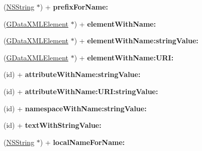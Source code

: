 \begin{DoxyCompactItemize}
\item 
\hypertarget{interface_g_data_x_m_l_node_ad6038ded1bfe166d7c87718dde7a466f}{
(\hyperlink{class_n_s_string}{NSString} $\ast$) + {\bfseries prefixForName:}}
\label{interface_g_data_x_m_l_node_ad6038ded1bfe166d7c87718dde7a466f}

\item 
\hypertarget{interface_g_data_x_m_l_node_ad7e4405c6195d993a5633faa1899c8a0}{
(\hyperlink{interface_g_data_x_m_l_element}{GDataXMLElement} $\ast$) + {\bfseries elementWithName:}}
\label{interface_g_data_x_m_l_node_ad7e4405c6195d993a5633faa1899c8a0}

\item 
\hypertarget{interface_g_data_x_m_l_node_ad8afb69afa7b083627e8a6db5eba45f7}{
(\hyperlink{interface_g_data_x_m_l_element}{GDataXMLElement} $\ast$) + {\bfseries elementWithName:stringValue:}}
\label{interface_g_data_x_m_l_node_ad8afb69afa7b083627e8a6db5eba45f7}

\item 
\hypertarget{interface_g_data_x_m_l_node_ae1241290bcd76d378ba9a5eb0612b6c4}{
(\hyperlink{interface_g_data_x_m_l_element}{GDataXMLElement} $\ast$) + {\bfseries elementWithName:URI:}}
\label{interface_g_data_x_m_l_node_ae1241290bcd76d378ba9a5eb0612b6c4}

\item 
\hypertarget{interface_g_data_x_m_l_node_abd922c9940730a4f78c906c2392123df}{
(id) + {\bfseries attributeWithName:stringValue:}}
\label{interface_g_data_x_m_l_node_abd922c9940730a4f78c906c2392123df}

\item 
\hypertarget{interface_g_data_x_m_l_node_a82060803e76687ce902f09c96f654ab2}{
(id) + {\bfseries attributeWithName:URI:stringValue:}}
\label{interface_g_data_x_m_l_node_a82060803e76687ce902f09c96f654ab2}

\item 
\hypertarget{interface_g_data_x_m_l_node_a59cd9e673bcf2be9ed19ebbabc68ad26}{
(id) + {\bfseries namespaceWithName:stringValue:}}
\label{interface_g_data_x_m_l_node_a59cd9e673bcf2be9ed19ebbabc68ad26}

\item 
\hypertarget{interface_g_data_x_m_l_node_a13761fd3b75c6f465800e2d4ae45db84}{
(id) + {\bfseries textWithStringValue:}}
\label{interface_g_data_x_m_l_node_a13761fd3b75c6f465800e2d4ae45db84}

\item 
\hypertarget{interface_g_data_x_m_l_node_abaa7cb3204ca104a89895f895728b942}{
(\hyperlink{class_n_s_string}{NSString} $\ast$) + {\bfseries localNameForName:}}
\label{interface_g_data_x_m_l_node_abaa7cb3204ca104a89895f895728b942}


\end{DoxyCompactItemize}

